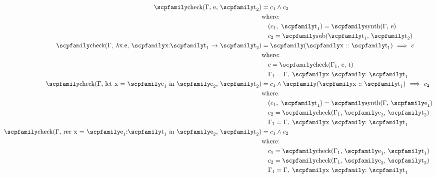 \documentclass[
  oneside,
  english,
  coorientadorbanca,
  noabntexcite
]{ufsc-thesis-rn46-2019}
\newcommand{\codett}[1]{\text{\scpfamily#1}}
\newcommand{\code}[1]{\text{\scpfamily\setlength\spaceskip{0.35em}#1}}
\newcommand{\typer}[2]{\code{#1 \codett{:} #2}}
\newcommand{\typecx}[2]{,\;\typer{#1}{#2}}
\newcommand{\fnty}[2]{\code{#1 $\rightarrow$ #2}}
\newcommand{\implcons}[3]{\code{$($\code{#1} $::$ #2$)$ $\implies$ #3}}
\begin{document}
\begin{figure}[ht]
  \begin{align*}
    \code{check($\Gamma$, e, $\code{t}_2$)}
     & = c_1 \land c_2                                                         \\
     & \textrm{where:}                                                         \\
     & \quad (c_1,\ \code{t}_1) = \code{synth($\Gamma$, e)}                    \\
     & \quad c_2 = \code{sub($\code{t}_1$, $\code{t}_2$)}                      \\
    \code{check($\Gamma$, $\lambda$x.e, \fnty{x:$\code{t}_1$}{$\code{t}_2$})}
     & = \implcons{x}{$\code{t}_1$}{$c$}                                       \\
     & \textrm{where:}                                                         \\
     & \quad c = \code{check($\Gamma_1$, e, t)}                                \\
     & \quad \Gamma_1 = \Gamma\typecx{x}{$\code{t}_1$}                         \\
    \code{check($\Gamma$, let x = $\code{e}_1$ in $\code{e}_2$, $\code{t}_2$)}
     & = c_1 \land \implcons{x}{$\code{t}_1$}{$c_2$}                           \\
     & \textrm{where:}                                                         \\
     & \quad (c_1,\ \code{t}_1) = \code{synth($\Gamma$, $\code{e}_1$)}         \\
     & \quad c_2 = \code{check($\Gamma_1$, $\code{e}_2$, $\code{t}_2$)}        \\
     & \quad \Gamma_1 = \Gamma\typecx{x}{$\code{t}_1$}                         \\
    \code{check($\Gamma$, rec x = $\code{e}_1$:$\code{t}_1$ in $\code{e}_2$, $\code{t}_2$)}
     & = c_1 \land c_2                                                         \\
     & \textrm{where:}                                                         \\
     & \quad c_1 = \code{check($\Gamma_1$, $\code{e}_1$, $\code{t}_1$)}        \\
     & \quad c_2 = \code{check($\Gamma_1$, $\code{e}_2$, $\code{t}_2$)}        \\
     & \quad \Gamma_1 = \Gamma\typecx{x}{$\code{t}_1$}                         \\

\end{align*}
\end{figure}
\end{document}
